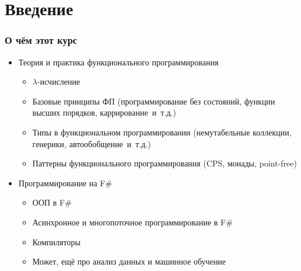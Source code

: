 \documentclass{../../slides-style}
\begin{document}
    
    \begin{frame}[plain]
        \titlepage
    \end{frame}
    
    \section{Введение}
    
    \begin{frame}
        \frametitle{О чём этот курс}
        \begin{itemize}
            \item Теория и практика функционального программирования
            \begin{itemize}
                \item $\lambda$-исчисление
                \item Базовые принципы ФП (программирование без состояний, функции высших порядков, каррирование~и~т.д.)
                \item Типы в функциональном программировании (немутабельные коллекции,
                    генерики, автообобщение~и~т.д.)
                \item Паттерны функционального программирования (CPS, монады, point-free)
            \end{itemize}
            \item Программирование на F\# 
            \begin{itemize}
                \item ООП в F\#
                \item Асинхронное и многопоточное программирование в F\#
                \item Компиляторы
                \item Может, ещё про анализ данных и машинное обучение
            \end{itemize}
        \end{itemize}
    \end{frame}
\end{document}
